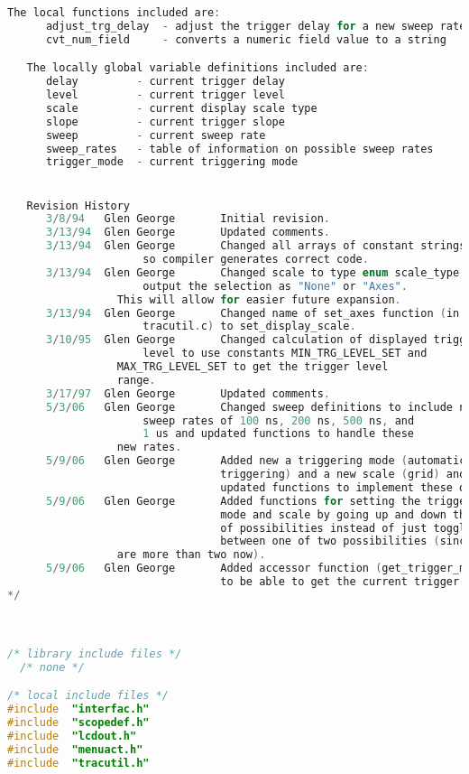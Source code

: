 \begin{lstlisting}[language=C]
   The local functions included are:
      adjust_trg_delay  - adjust the trigger delay for a new sweep rate
      cvt_num_field     - converts a numeric field value to a string

   The locally global variable definitions included are:
      delay         - current trigger delay
      level         - current trigger level
      scale         - current display scale type
      slope         - current trigger slope
      sweep         - current sweep rate
      sweep_rates   - table of information on possible sweep rates
      trigger_mode  - current triggering mode


   Revision History
      3/8/94   Glen George       Initial revision.
      3/13/94  Glen George       Updated comments.
      3/13/94  Glen George       Changed all arrays of constant strings to be
      				 so compiler generates correct code.
      3/13/94  Glen George       Changed scale to type enum scale_type and
      				 output the selection as "None" or "Axes".
				 This will allow for easier future expansion.
      3/13/94  Glen George       Changed name of set_axes function (in
      				 tracutil.c) to set_display_scale.
      3/10/95  Glen George       Changed calculation of displayed trigger
      				 level to use constants MIN_TRG_LEVEL_SET and
				 MAX_TRG_LEVEL_SET to get the trigger level
				 range.
      3/17/97  Glen George       Updated comments.
      5/3/06   Glen George       Changed sweep definitions to include new
      				 sweep rates of 100 ns, 200 ns, 500 ns, and
			         1 us and updated functions to handle these
				 new rates.
      5/9/06   Glen George       Added new a triggering mode (automatic
                                 triggering) and a new scale (grid) and
                                 updated functions to implement these options.
      5/9/06   Glen George       Added functions for setting the triggering
                                 mode and scale by going up and down the list
                                 of possibilities instead of just toggling
                                 between one of two possibilities (since there
				 are more than two now).
      5/9/06   Glen George       Added accessor function (get_trigger_mode)
                                 to be able to get the current trigger mode.
*/



/* library include files */
  /* none */

/* local include files */
#include  "interfac.h"
#include  "scopedef.h"
#include  "lcdout.h"
#include  "menuact.h"
#include  "tracutil.h"





\end{lstlisting}
